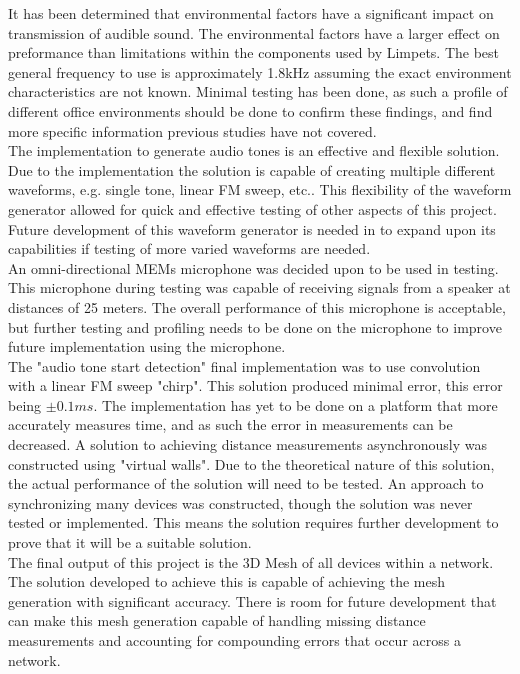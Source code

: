 
It has been determined that environmental factors have a significant impact on transmission of audible sound. The environmental factors have a larger effect on preformance than limitations within the components used by Limpets. The best general frequency to use is approximately 1.8kHz assuming the exact environment characteristics are not known. Minimal testing has been done, as such a profile of different office environments should be done to confirm these findings, and find more specific information previous studies have not covered.\\


The implementation to generate audio tones is an effective and flexible solution. Due to the implementation the solution is capable of creating multiple different waveforms, e.g. single tone, linear FM sweep, etc.. This flexibility of the waveform generator allowed for quick and effective testing of other aspects of this project. Future development of this waveform generator is needed in to expand upon its capabilities if testing of more varied waveforms are needed.\\


An omni-directional MEMs microphone was decided upon to be used in testing. This microphone during testing was capable of receiving signals from a speaker at distances of 25 meters. The overall performance of this microphone is acceptable, but further testing and profiling needs to be done on the microphone to improve future implementation using the microphone.\\


The "audio tone start detection" final implementation was to use convolution with a linear FM sweep "chirp". This solution produced minimal error, this error being $\pm 0.1ms$. The implementation has yet to be done on a platform that more accurately measures time, and as such the error in measurements can be decreased. A solution to achieving distance measurements asynchronously was constructed using "virtual walls". Due to the theoretical nature of this solution, the actual performance of the solution will need to be tested. An approach to synchronizing many devices was constructed, though the solution was never tested or implemented. This means the solution requires further development to prove that it will be a suitable solution.\\

The final output of this project is the 3D Mesh of all devices within a network. The solution developed to achieve this is capable of achieving the mesh generation with significant accuracy. There is room for future development that can make this mesh generation capable of handling missing distance measurements and accounting for compounding errors that occur across a network.




